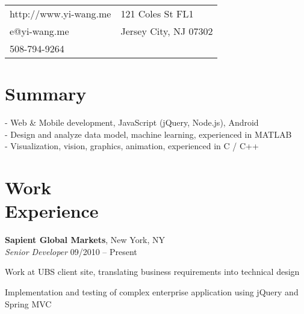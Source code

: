 \documentclass[margin,line]{resume}
\begin{document}
\begin{resume}

      \begin{tabular}{@{}p{6cm}p{8.5cm}}
      http://www.yi-wang.me  &  121 Coles St FL1 \\
      e@yi-wang.me             &  Jersey City, NJ 07302 \\
      508-794-9264	& \\
      \end{tabular}

 
    \section{\mysidestyle Summary}
      
      - Web \& Mobile development, JavaScript (jQuery, Node.js), Android \\
      - Design and analyze data model, machine learning, experienced in MATLAB \\
      - Visualization, vision, graphics, animation, experienced in C / C++ \\
      
    \section{\mysidestyle Work \\ Experience}

    \textbf{Sapient Global Markets}, New York, NY \\
    \textsl{Senior Developer} \hfill 09/2010 -- Present \vspace{-3mm}\\\vspace{-1mm}%
      \begin{list2}
      \item Work at UBS client site, translating business requirements into technical design
      \item Implementation and testing of complex enterprise application using jQuery and Spring MVC
      \end{list2}


\end{resume}
\end{document}

